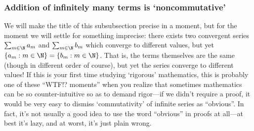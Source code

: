 \subsubsection{Addition of infinitely many terms is `noncommutative'}

We will make the title of this subsubsection precise in a moment, but for the moment we will settle for something imprecise:  there exists two convergent series $\sum _{m\in \N}a_m$ and $\sum _{m\in \N}b_m$ which converge to different values, but yet $\{ a_m:m\in \N \} =\{ b_m:m\in \N \}$.  That is, the terms themselves are the same (though in different order of course), but yet the series converge to different values!  If this is your first time studying `rigorous' mathematics, this is probably one of these ``WTF!? moments'' when you realize that sometimes mathematics can be so counter-intuitive so as to demand rigor---if we didn't require a proof, it would be very easy to dismiss `commutativity' of infinite series as ``obvious''.  In fact, it's not usually a good idea to use the word ``obvious'' in proofs at all---at best it's lazy, and at worst, it's just plain wrong.

